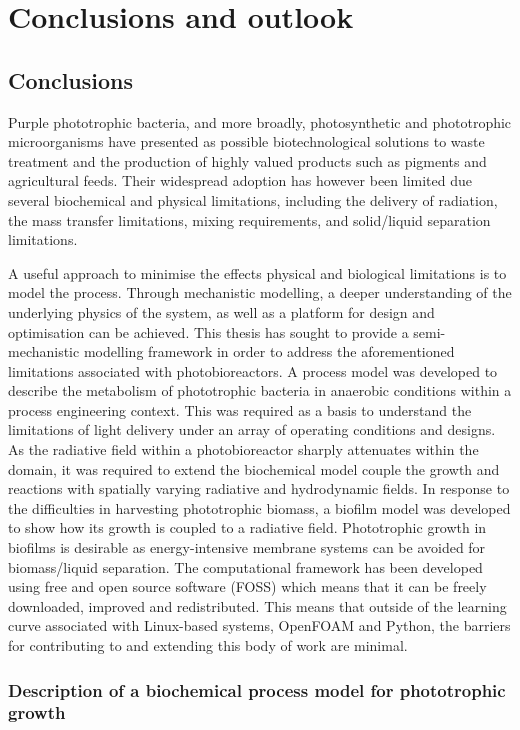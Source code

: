 \chapter[Conclusions and outlook]{Conclusions and outlook}
\label{chap:conclusion}

\section{Conclusions}
Purple phototrophic bacteria, and more broadly, photosynthetic and phototrophic microorganisms have presented as possible biotechnological solutions to waste treatment and the production of highly valued products such as pigments and agricultural feeds. Their widespread adoption has however been limited due several biochemical and physical limitations, including the delivery of radiation, the mass transfer limitations, mixing requirements, and solid/liquid separation limitations. 

A useful approach to minimise the effects physical and biological limitations is to model the process. Through mechanistic modelling, a deeper understanding of the underlying physics of the system, as well as a platform for design and optimisation can be achieved. This thesis has sought to provide a semi-mechanistic modelling framework in order to address the aforementioned limitations associated with photobioreactors. A process model was developed to describe the metabolism of phototrophic bacteria in anaerobic conditions within a process engineering context. This was required as a basis to understand the limitations of light delivery under an array of operating conditions and designs. As the radiative field within a photobioreactor sharply attenuates within the domain, it was required to extend the biochemical model couple the growth and reactions with spatially varying radiative and hydrodynamic fields. In response to the difficulties in harvesting phototrophic biomass, a biofilm model was developed to show how its growth is coupled to a radiative field. Phototrophic growth in biofilms is desirable as energy-intensive membrane systems can be avoided for biomass/liquid separation. The computational framework has been developed using free and open source software (FOSS) which means that it can be freely downloaded, improved and redistributed. This means that outside of the learning curve associated with Linux-based systems, OpenFOAM and Python, the barriers for contributing to and extending this body of work are minimal.

\subsection{Description of a biochemical process model for phototrophic growth}




